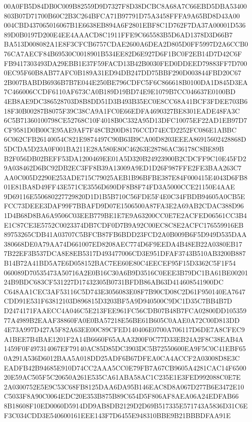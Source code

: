 \documentclass[UTF8,fontset=fandol,zihao=-4,a4paper]{ctexart}
\begin{document}
{{00A0FB5D84DB0C009B82559D9D7327F8D38DCBC8A68A7C66EBD5DBA53400803B07D71700B60C2B3C264BFCA71B97791D75A3458FFFA9A65BD8D43A00
004CBD437065016067B1E6638EB894A6F2801EBF8C1D762F7DA37A00001D53689D0B0197D200E4EE4AAACD8C1911FFE9C665583B5D6AD1378D3D66B7
BA513D008082A1E8F3CFCB6757CDAE2600A6DEA2D805D0FF5997D2A6CCB076CA7AECF84B69530C0018901B534EE82D6E927D6F1BC0F2EB14D7D42C6F
FB9417303493DA29EBB1E37F59FACD13B42B0030FED0DDEED79883FF7D7000EC95F60B8AB77AFC0B189A31ED94DB247DD75BBF290D003844FBD20C67
2B007BABDB6936B7B7E044E250BE796CDFC5F6C866618B0100DA1D845D3EA7C466006CCDF6110AF673CA0B189D19BD74E9E1079B7CC046637E0100BD
4EB8AE9DC386528703D8B8DD51D3B493B35EC0E8CC68A41BCF3FDEE703B618F30B00287B8075F39C38CA9A1FC0E66EDFA4690327BE8301EADE48FA3C
6C5B71360100798CE52768C10F4018B0C332A95D13DFC10075EF22AD1EB97D7CF9581D0B00CE95AE9AF7F48CB200D8176CCD74ECD2252FC086E1ABBC
6C062CFB26140054C821E9874497C90B63B9CA00D8203EEEA86915602428868D5DCDA5D23A0F001BA211E28A580E80C46263E28786AC36178C8BE89B
B2F056DB02BEFF53DA1200469EE01A5D320B24923900B2CDCFF9C10E45FD29A038462D6BC92DB2EC3FF8B39A13009A9ED1D26F987FFE2FE3BAA263C7
AA0C005D2290E253ADE715C79025AEB1B96BFBE387E84F000415E4043D6FB801E81BA8D49FF43E571CE3556D690DF8B8F74FD3A5000CCE21150E4AAE
9D69116E550680227729820D1D1B5B710C56FDE5F4E0C34FBDB94605A0CB5EFCC73DEEE3DAF99F7BBAFD9D07E1506500A87FA3E2A69AB2CDAC388D96
1D4B68D8BA6A9506C03EEB779BE1E7E9A63200CC0E7E2ACFED06561CC3B4E1C87CE3E5752C0023374DB7CDF0D7B9A92C00EC8C8E2ACFC176559916EB
89753265CDB41A03707C5BFCB87FB6BDD23FCD2A0B009B6F5D949D535DAA380668DE0A79AA74D661007ED8208AEC774D6F9EEDA4B48EB22A0380EB17
7B22EF3B537DCA8E8EB5317D493477006CD3E951DFAF3743B510AB3200B887B14B72A41BD5A7E6D058152BAC7EE60E80C4EECEF95F15D3362C5F1F54
060089D70535473A50716A2E0B16C30A6B9D3516C0EEE3B79DC1BA61BE0020124B9BDC683CF531227D17432305B0731BFDB86AB63D414608541900DC
C648AA1CEC3AF53116C5D743E3056083E08F7B90CD08C2D61F950140EA7647CDD91E531F63812103D896815D3203BF5A9D940500C9DC1D35C7BB4B7D
D2474171FAAECC4A046C5E213FEE961FC56CDB07B48B7FCA02800DD10535977A4989B2EAAF38860FA0E0BA57218E56BE61B605C0AAE0A72C00D813DD
4E73A997D427A5F82A63EE00C89CFED140406E0700A706117D6DE7A8CFEC9A1BEE7B4BAE1201F2A14B6660F65AAA3200F0C77D33EB24A2F8C38EAB4A
1459F0F497314067EF79140AC85D85DC3903DC5B72550600EA9F5C0C41EBF650A291A536D6012BAA5A018DD25ADF6B67DFEA0CA4ACCF2A03008D8E3C
EADFB42B94685E910D74CC2AAA5CC0E79FB7A67CB9605A4281CAC14F650020E59AC505F5C20650A261E535CA61ABA58AC1C235E1E3FED992088C0E7E
2A0300752E5E9C53C68FB8125DAA6DA95B146EAC8D8A067D277B6E3472E10C5033F8A90C0064EDC20E353B875B89C654D5F806AF8AEA06A24EDFAB66
8B18608F10ED0060D5914DD9AB8DB2129D2D69B517335E571743A5836D31C6EF3C034CDD3E540600161EEE143F7D6455E948310BBE9B21BBBDFAA91E
}}
\end{document}
